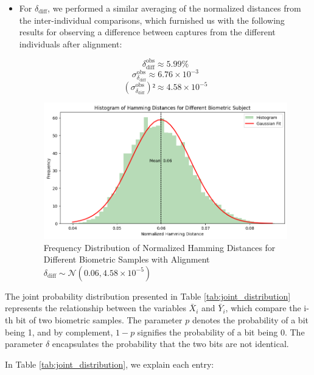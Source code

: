 \begin{enumerate}
\begin{itemize}
        \newpage
        \item For \( \delta_{\text{diff}} \), we performed a similar averaging of the normalized distances from the inter-individual comparisons, which furnished us with the following results for observing a difference between captures from the different individuals after alignment:

        \[ \delta_{\text{diff}}^{\text{obs}} \approx 5.99\% \]
        \[ \sigma^{\text{obs}}_{\delta_{\text{diff}}} \approx 6.76 \times 10^{-3} \]
        \[ (\sigma^{\text{obs}}_{\delta_{\text{diff}}})² \approx 4.58 \times 10^{-5} \]

        \begin{figure}[H]
            \centering
            \includegraphics[width=0.7\linewidth]{latex-img/delta_diff.png}
            \caption{Frequency Distribution of Normalized Hamming Distances for Different Biometric Samples with Alignment \(\delta_{\text{diff}} \sim \mathcal{N}(0.06, 4.58 \times 10^{-5})\)}
            \label{delta_diff}
        \end{figure}
    \end{itemize}
\end{enumerate}

The joint probability distribution presented in Table \ref{tab:joint_distribution} represents the relationship between the variables \(\bar{X}_i\) and \(\bar{Y}_i\), which compare the i-th bit of two biometric samples. The parameter \(p\) denotes the probability of a bit being 1, and by complement, \(1-p\) signifies the probability of a bit being 0. The parameter \(\delta\) encapsulates the probability that the two bits are not identical.

In Table \ref{tab:joint_distribution}, we explain each entry:

